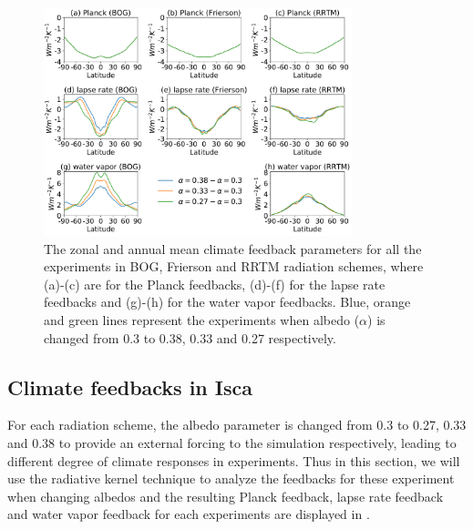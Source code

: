\begin{figure}[ht]
	\centering
	\includegraphics[width=0.8\textwidth]{figs/polar_amp/all_zonalmean_feedbacks}
	\caption[The zonal and annual mean climate feedback parameters for all the experiments in BOG, Frierson and RRTM radiation schemes]{The zonal and annual mean climate feedback parameters for all the experiments in BOG, Frierson and RRTM radiation schemes, where (a)-(c) are for the Planck feedbacks, (d)-(f) for the lapse rate feedbacks and (g)-(h) for the water vapor feedbacks. Blue, orange and green lines represent the experiments when albedo ($\alpha$) is changed from 0.3 to 0.38, 0.33 and 0.27 respectively.}
	\label{fig:all_feedbacks}
\end{figure}


\subsection{Climate feedbacks in Isca}
For each radiation scheme, the albedo parameter is changed from 0.3 to 0.27, 0.33 and 0.38 to provide an external forcing to the simulation respectively, leading to different degree of climate responses in experiments. Thus in this section, we will use the radiative kernel technique to analyze the feedbacks for these experiment when changing albedos and the resulting Planck feedback, lapse rate feedback and water vapor feedback for each experiments are displayed in .


